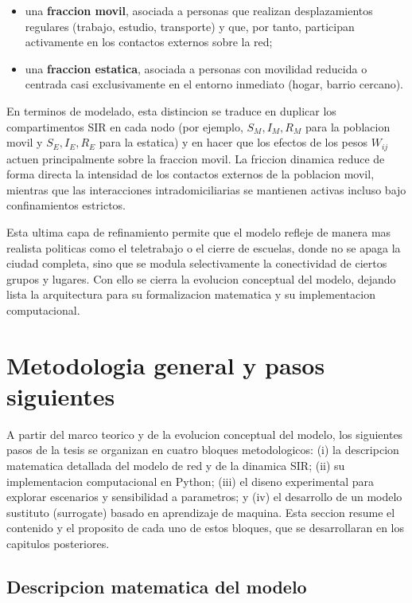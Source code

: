 \begin{itemize}
    \item una \textbf{fraccion movil}, asociada a personas que realizan desplazamientos regulares (trabajo, estudio, transporte) y que, por tanto, participan activamente en los contactos externos sobre la red;
    \item una \textbf{fraccion estatica}, asociada a personas con movilidad reducida o centrada casi exclusivamente en el entorno inmediato (hogar, barrio cercano).
\end{itemize}

En terminos de modelado, esta distincion se traduce en duplicar los compartimentos SIR en cada nodo (por ejemplo, $S_M, I_M, R_M$ para la poblacion movil y $S_E, I_E, R_E$ para la estatica) y en hacer que los efectos de los pesos $W_{ij}$ actuen principalmente sobre la fraccion movil. La friccion dinamica reduce de forma directa la intensidad de los contactos externos de la poblacion movil, mientras que las interacciones intradomiciliarias se mantienen activas incluso bajo confinamientos estrictos.

Esta ultima capa de refinamiento permite que el modelo refleje de manera mas realista politicas como el teletrabajo o el cierre de escuelas, donde no se apaga la ciudad completa, sino que se modula selectivamente la conectividad de ciertos grupos y lugares. Con ello se cierra la evolucion conceptual del modelo, dejando lista la arquitectura para su formalizacion matematica y su implementacion computacional.



\section{Metodologia general y pasos siguientes}

A partir del marco teorico y de la evolucion conceptual del modelo, los siguientes pasos de la tesis se organizan en cuatro bloques metodologicos: 
(i) la descripcion matematica detallada del modelo de red y de la dinamica SIR; 
(ii) su implementacion computacional en Python; 
(iii) el diseno experimental para explorar escenarios y sensibilidad a parametros; 
y (iv) el desarrollo de un modelo sustituto (surrogate) basado en aprendizaje de maquina. 
Esta seccion resume el contenido y el proposito de cada uno de estos bloques, que se desarrollaran en los capitulos posteriores.

\subsection{Descripcion matematica del modelo}

